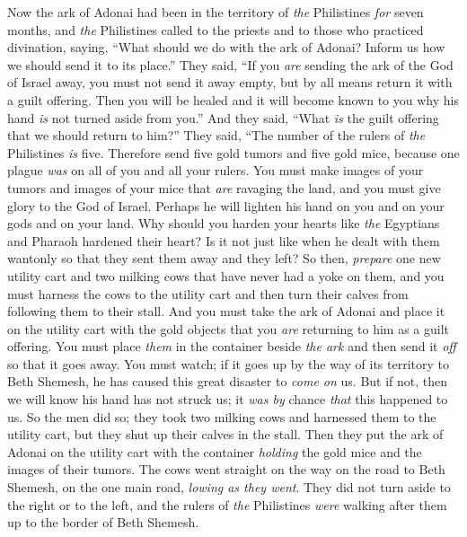 \begin{biblechapter} %
 Now the ark of Adonai had been in the territory of \textit{the} Philistines \textit{for} seven months,
\verse and \textit{the} Philistines called to the priests and to those who practiced divination, saying, “What should we do with the ark of Adonai? Inform us how we should send it to its place.”
\verse They said, “If you \textit{are} sending the ark of the God of Israel away, you must not send it away empty, but by all means return it with a guilt offering. Then you will be healed and it will become known to you why his hand \textit{is} not turned aside from you.”
\verse And they said, “What \textit{is} the guilt offering that we should return to him?” They said, “The number of the rulers of \textit{the} Philistines \textit{is} five. Therefore send five gold tumors and five gold mice, because one plague \textit{was} on all of you and all your rulers.
\verse You must make images of your tumors and images of your mice that \textit{are} ravaging the land, and you must give glory to the God of Israel. Perhaps he will lighten his hand on you and on your gods and on your land.
\verse Why should you harden your hearts like \textit{the} Egyptians and Pharaoh hardened their heart? Is it not just like when he dealt with them wantonly so that they sent them away and they left?
\verse So then, \textit{prepare} one new utility cart and two milking cows that have never had a yoke on them, and you must harness the cows to the utility cart and then turn their calves from following them to their stall.
\verse And you must take the ark of Adonai and place it on the utility cart with the gold objects that you \textit{are} returning to him as a guilt offering. You must place \textit{them} in the container beside \textit{the ark} and then send it \textit{off} so that it goes away.
\verse You must watch; if it goes up by the way of its territory to Beth Shemesh, he has caused this great disaster to \textit{come on} us. But if not, then we will know his hand has not struck us; it \textit{was by} chance \textit{that} this happened to us.
\verse So the men did so; they took two milking cows and harnessed them to the utility cart, but they shut up their calves in the stall.
\verse Then they put the ark of Adonai on the utility cart with the container \textit{holding} the gold mice and the images of their tumors.
\verse The cows went straight on the way on the road to Beth Shemesh, on the one main road, \textit{lowing as they went}. They did not turn aside to the right or to the left, and the rulers of \textit{the} Philistines \textit{were} walking after them up to the border of Beth Shemesh.

\end{biblechapter}
